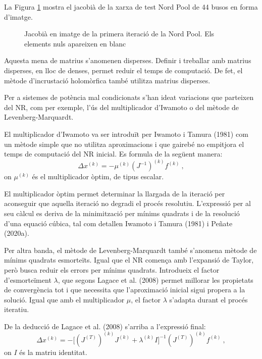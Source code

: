 La Figura \ref{fig:dispersa_nord} mostra el jacobià de la xarxa de test Nord Pool de 44 busos en forma d'imatge.

\begin{figure}[!ht] \footnotesize
    \begin{center}
    \caption{Jacobià en imatge de la primera iteració de la Nord Pool. Els elements nuls apareixen en blanc}
    \label{fig:dispersa_nord}
    \end{center}
\end{figure}

Aquesta mena de matrius s'anomenen disperses. Definir i treballar amb matrius disperses, en lloc de denses, permet reduir el temps de computació. De fet, el mètode d'incrustació holomòrfica també utilitza matrius disperses.  

Per a sistemes de potència mal condicionats s'han ideat variacions que parteixen del NR, com per exemple, l'ús del multiplicador d'Iwamoto o del mètode de Levenberg-Marquardt.

El multiplicador d'Iwamoto va ser introduït per Iwamoto i Tamura (1981) com un mètode simple que no utilitza aproximacions i que gairebé no empitjora el temps de computació del NR inicial. Es formula de la següent manera:
\begin{equation}
    \Delta x^{(k)} = -\mu ^{(k)} (J^{-1})^{(k)} f^{(k)}\ ,
    \label{eq:iwamoto}
\end{equation}
on $\mu^{(k)}$ és el multiplicador òptim, de tipus escalar. 

El multiplicador òptim permet determinar la llargada de la iteració per aconseguir que aquella iteració no degradi el procés resolutiu. L'expressió per al seu càlcul es deriva de la minimització per mínims quadrats i de la resolució d'una equació cúbica, tal com detallen Iwamoto i Tamura (1981) i Peñate (2020a).

Per altra banda, el mètode de Levenberg-Marquardt també s'anomena mètode de mínims quadrats esmorteïts. Igual que el NR comença amb l'expansió de Taylor, però busca reduir els errors per mínims quadrats. Introdueix el factor d'esmorteïment $\lambda$, que segons Lagace et al. (2008) permet millorar les propietats de convergència tot i que necessita que l'aproximació inicial sigui propera a la solució. Igual que amb el multiplicador $\mu$, el factor $\lambda$ s'adapta durant el procés iteratiu. 

De la deducció de Lagace et al. (2008) s'arriba a l'expressió final:
\begin{equation}
    \Delta x^{(k)} = -\bigl[(J^{(T)})^{(k)}J^{(k)}+\lambda^{(k)} I\bigr]^{-1}(J^{(T)})^{(k)}f^{(k)}\ ,
    \label{eq:levenberg1}
\end{equation}
on $I$ és la matriu identitat. 

